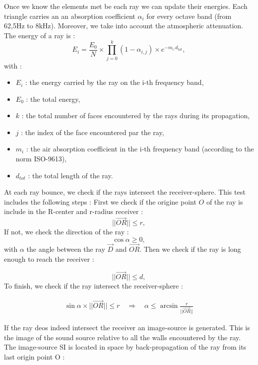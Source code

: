 \documentclass[AMA,STIX1COL]{WileyNJD-v2}
\begin{document}
Once we know the elements met be each ray we can update their energies. Each triangle carries an an absorption coefficient $\alpha_i$ for every octave band (from 62,5Hz to 8kHz). Moreover, we take into account the atmospheric attenuation. The energy of a ray is :
\begin{equation}
E_{i} =  \frac{E_0}{N} \times \prod_{j=0}^{k}{(1-\alpha_{i,j})} \times e^{-m_i . d_{tot}},
\end{equation}
with : 
\begin{itemize}
\item $E_{i}$ : the energy carried by the ray on the i-th frequency band,
\item $E_{0}$ : the total energy,
\item $k$ : the total number of faces encountered by the rays during its propagation,
\item $j$ : the index of the face encountered par the ray,
\item $m_i$ : the air absorption coefficient in the i-th frequency band (according to the norm ISO-9613),
\item $ d_{tot}$ : the total length of the ray.
\end{itemize}

At each ray bounce, we check if the rays intersect the receiver-sphere. This test includes the following steps :
First we check if the origine point $O$ of the ray is include in the R-center and r-radius receiver :
\begin{equation}
||\overrightarrow{OR}|| \leqslant r,
\end{equation}
%
If not, we check the direction of the ray :
\begin{equation}
\cos{\alpha} \geqslant 0,
\end{equation}
with $\alpha$ the angle between the ray $\overrightarrow{D}$ and $\overrightarrow{OR}$. Then we check if the ray is long enough to reach the receiver :

\begin{equation}
||\overrightarrow{OR}|| \leqslant d,
\end{equation}
%
To finish, we check if the ray intersect the receiver-sphere :

\begin{align}
\sin{\alpha} \times ||\overrightarrow{OR}||  \leqslant r 
\quad \Rightarrow \quad
\alpha  \leqslant \arcsin{\frac{r}{||\overrightarrow{OR}||}}
\end{align}

If the ray deos indeed intersect the receiver an image-source is generated. This is the image of the sound source relative to all the walls encountered by the ray. The image-source SI is located in space by back-propagation of the ray from its last origin point O :
\end{document}
